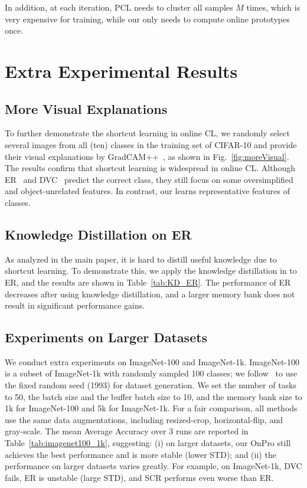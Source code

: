 In addition, at each iteration, PCL needs to cluster all samples $M$ times, which is very expensive for training, while our \methodname only needs to compute online prototypes once.






\section{Extra Experimental Results}
\label{appendix:extra_exp}
\subsection{More Visual Explanations}
\label{appendix:more_visual}
To further demonstrate the shortcut learning in online CL, we randomly select several images from all (ten) classes in the training set of CIFAR-10 and provide their visual explanations by GradCAM++~\cite{Grad-cam++}, as shown in Fig.~\ref{fig:moreVisual}.
The results confirm that shortcut learning is widespread in online CL. Although ER~\cite{ER} and DVC~\cite{DVC} predict the correct class, they still focus on some oversimplified and object-unrelated features. In contrast, our \frameworkName learns representative features of classes.





\subsection{Knowledge Distillation on ER}
As analyzed in the main paper, it is hard to distill useful knowledge due to shortcut learning. To demonstrate this, we apply the knowledge distillation in \cite{protoAug} to ER, and the results are shown in Table~\ref{tab:KD_ER}.
The performance of ER decreases after using knowledge distillation, and a larger memory bank does not result in significant performance gains.



\subsection{Experiments on Larger Datasets}
We conduct extra experiments on ImageNet-100 and ImageNet-1k. ImageNet-100
is a subset of ImageNet-1k with randomly sampled 100 classes; we follow~\cite{Imagenet_spilt} to use the fixed random seed (1993) for dataset generation. We set the number of tasks to 50, the batch size and the buffer batch size to 10, and the memory bank size to 1k for ImageNet-100 and 5k for ImageNet-1k. For a fair comparison, all methods use the same data augmentations, including resized-crop, horizontal-flip, and gray-scale. 
The mean Average Accuracy over 3 runs are reported in Table~\ref{tab:imagenet100_1k}, suggesting: (i) on larger datasets, our OnPro still achieves the best performance and is more stable (lower STD); and (ii) the performance on larger datasets varies greatly. For example, on ImageNet-1k, DVC fails, ER is unstable (large STD), and SCR performs even worse than ER.



